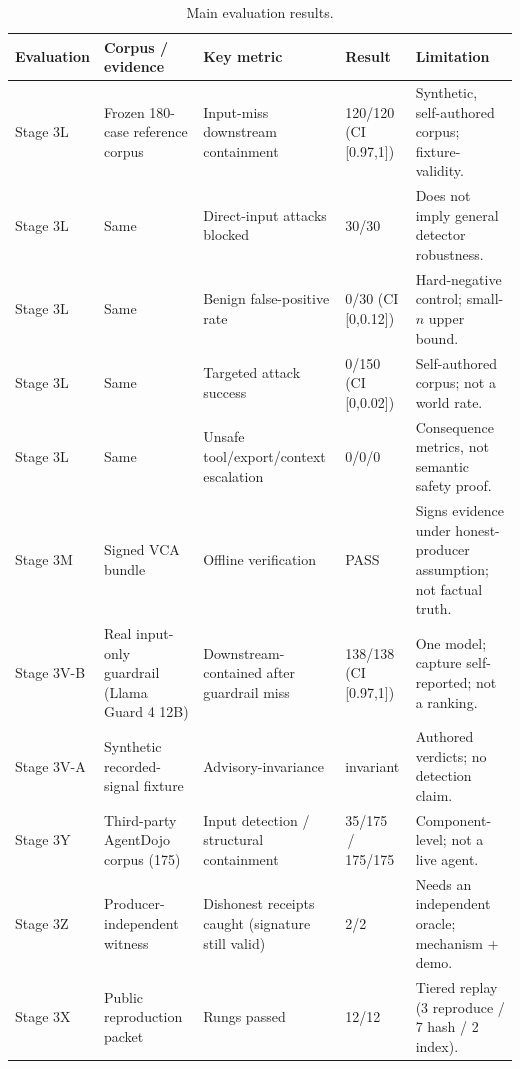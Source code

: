 \documentclass[sigconf,anonymous,review]{acmart}
\begin{document}
\begin{table}[t]
\caption{Main evaluation results.}
\label{tab:results}
\begin{tabularx}{\textwidth}{p{}p{}p{}p{}X}
\toprule
Evaluation & Corpus / evidence & Key metric & Result & Limitation \\
\midrule
Stage 3L & Frozen 180-case reference corpus & Input-miss downstream containment & 120/120 (CI [0.97,1]) & Synthetic, self-authored corpus; fixture-validity. \\
Stage 3L & Same & Direct-input attacks blocked & 30/30 & Does not imply general detector robustness. \\
Stage 3L & Same & Benign false-positive rate & 0/30 (CI [0,0.12]) & Hard-negative control; small-$n$ upper bound. \\
Stage 3L & Same & Targeted attack success & 0/150 (CI [0,0.02]) & Self-authored corpus; not a world rate. \\
Stage 3L & Same & Unsafe tool/export/context escalation & 0/0/0 & Consequence metrics, not semantic safety proof. \\
Stage 3M & Signed VCA bundle & Offline verification & PASS & Signs evidence under honest-producer assumption; not factual truth. \\
Stage 3V-B & Real input-only guardrail (Llama Guard 4 12B) & Downstream-contained after guardrail miss & 138/138 (CI [0.97,1]) & One model; capture self-reported; not a ranking. \\
Stage 3V-A & Synthetic recorded-signal fixture & Advisory-invariance & invariant & Authored verdicts; no detection claim. \\
Stage 3Y & Third-party AgentDojo corpus (175) & Input detection / structural containment & 35/175 \,/\, 175/175 & Component-level; not a live agent. \\
Stage 3Z & Producer-independent witness & Dishonest receipts caught (signature still valid) & 2/2 & Needs an independent oracle; mechanism + demo. \\
Stage 3X & Public reproduction packet & Rungs passed & 12/12 & Tiered replay (3 reproduce / 7 hash / 2 index). \\
\bottomrule
\end{tabularx}
\end{table}
\end{document}

